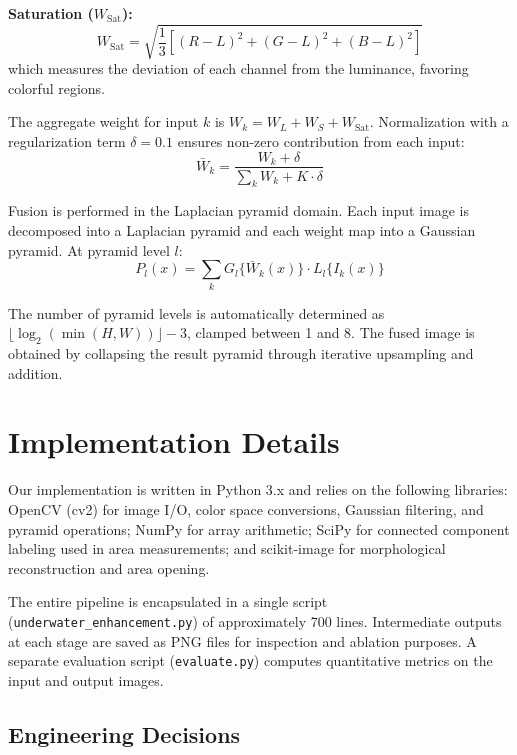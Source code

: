 \documentclass[conference]{IEEEtran}
\begin{document}
\textbf{Saturation ($W_{\text{Sat}}$):}
\begin{equation}
    W_{\text{Sat}} = \sqrt{\frac{1}{3}\left[(R - L)^2 + (G - L)^2 + (B - L)^2\right]}
    \label{eq:saturation}
\end{equation}
which measures the deviation of each channel from the luminance, favoring colorful regions.

The aggregate weight for input $k$ is $W_k = W_L + W_S + W_{\text{Sat}}$. Normalization with a regularization term $\delta = 0.1$ ensures non-zero contribution from each input:
\begin{equation}
    \bar{W}_k = \frac{W_k + \delta}{\sum_{k} W_k + K \cdot \delta}
    \label{eq:weight_norm}
\end{equation}

Fusion is performed in the Laplacian pyramid domain. Each input image is decomposed into a Laplacian pyramid and each weight map into a Gaussian pyramid. At pyramid level $l$:
\begin{equation}
    P_l(x) = \sum_{k} G_l\{\bar{W}_k(x)\} \cdot L_l\{I_k(x)\}
    \label{eq:fusion}
\end{equation}

The number of pyramid levels is automatically determined as $\lfloor \log_2(\min(H, W)) \rfloor - 3$, clamped between 1 and 8. The fused image is obtained by collapsing the result pyramid through iterative upsampling and addition.


\section{Implementation Details}

Our implementation is written in Python 3.x and relies on the following libraries: OpenCV (cv2) for image I/O, color space conversions, Gaussian filtering, and pyramid operations; NumPy for array arithmetic; SciPy for connected component labeling used in area measurements; and scikit-image for morphological reconstruction and area opening.

The entire pipeline is encapsulated in a single script (\texttt{underwater\_enhancement.py}) of approximately 700 lines. Intermediate outputs at each stage are saved as PNG files for inspection and ablation purposes. A separate evaluation script (\texttt{evaluate.py}) computes quantitative metrics on the input and output images.

\subsection{Engineering Decisions}
\end{document}
